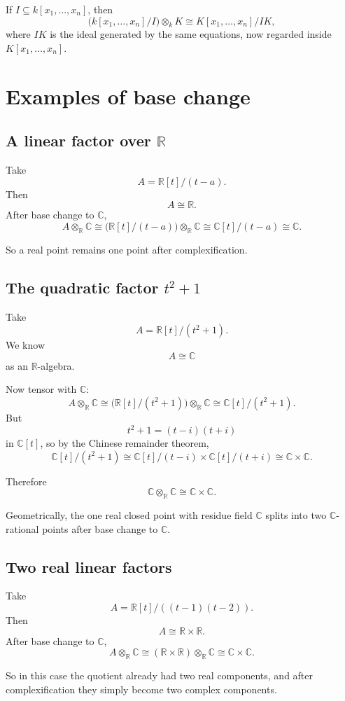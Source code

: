 \documentclass[12pt,a4paper]{article}
\theoremstyle{notespace}
\newcommand{\R}{\mathbb R}
\newcommand{\C}{\mathbb C}
\theoremstyle{definition}
\begin{document}
	If \(I\subseteq k[x_1,\dots,x_n]\), then
	\[
	\bigl(k[x_1,\dots,x_n]/I\bigr)\otimes_k K
	\cong
	K[x_1,\dots,x_n]/IK,
	\]
	where \(IK\) is the ideal generated by the same equations, now regarded inside \(K[x_1,\dots,x_n]\).
	
	\section{Examples of base change}
	
	\subsection{A linear factor over \(\R\)}
	
	Take
	\[
	A=\R[t]/(t-a).
	\]
	Then
	\[
	A\cong \R.
	\]
	After base change to \(\C\),
	\[
	A\otimes_{\R}\C
	\cong
	\bigl(\R[t]/(t-a)\bigr)\otimes_{\R}\C
	\cong
	\C[t]/(t-a)
	\cong
	\C.
	\]
	
	So a real point remains one point after complexification.
	
	\subsection{The quadratic factor \(t^2+1\)}
	
	Take
	\[
	A=\R[t]/(t^2+1).
	\]
	We know
	\[
	A\cong \C
	\]
	as an \(\R\)-algebra.
	
	Now tensor with \(\C\):
	\[
	A\otimes_{\R}\C
	\cong
	\bigl(\R[t]/(t^2+1)\bigr)\otimes_{\R}\C
	\cong
	\C[t]/(t^2+1).
	\]
	But
	\[
	t^2+1=(t-i)(t+i)
	\]
	in \(\C[t]\), so by the Chinese remainder theorem,
	\[
	\C[t]/(t^2+1)\cong \C[t]/(t-i)\times \C[t]/(t+i)\cong \C\times \C.
	\]
	
	Therefore
	\[
	\C\otimes_{\R}\C \cong \C\times \C.
	\]
	
	Geometrically, the one real closed point with residue field \(\C\) splits into two \(\C\)-rational points after base change to \(\C\).
	
	\subsection{Two real linear factors}
	
	Take
	\[
	A=\R[t]/((t-1)(t-2)).
	\]
	Then
	\[
	A\cong \R\times \R.
	\]
	After base change to \(\C\),
	\[
	A\otimes_{\R}\C
	\cong
	(\R\times \R)\otimes_{\R}\C
	\cong
	\C\times \C.
	\]
	
	So in this case the quotient already had two real components, and after complexification they simply become two complex components.
	
\end{document}
